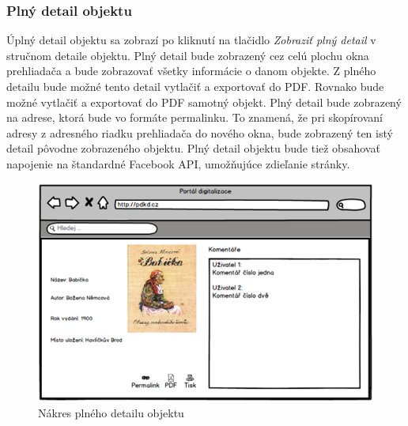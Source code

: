 \documentclass[
  print, %
  table,   %
  lof,     %
  nolot,     %
]{fithesis3}
\begin{document}
\subsubsection{Plný detail objektu}
Úplný detail objektu sa zobrazí po kliknutí na tlačidlo \textit{Zobraziť plný detail} v stručnom detaile objektu. Plný detail bude zobrazený cez celú plochu okna prehliadača a bude zobrazovať všetky informácie o danom objekte.
Z plného detailu bude možné tento detail vytlačiť a exportovať do PDF. Rovnako bude možné vytlačiť a exportovať do PDF samotný objekt. Plný detail bude zobrazený na adrese, ktorá bude vo formáte permalinku. To znamená, že pri skopírovaní adresy z adresného riadku prehliadača do nového okna, bude zobrazený ten istý detail pôvodne zobrazeného objektu. Plný detail objektu bude tiež obsahovať napojenie na štandardné Facebook API, umožňujúce zdieľanie stránky.
\begin{figure}[H]
	\centering
	\includegraphics[width=\textwidth]{fithesis/mockup/detail-full.png}	
	\caption{Nákres plného detailu objektu}
	\label{mockup-detail-full}
\end{figure}
\end{document}
